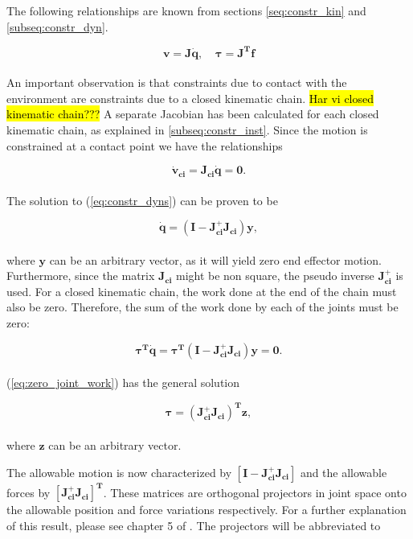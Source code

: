 The following relationships are known from sections \ref{seq:constr_kin} and \ref{subseq:constr_dyn}. 

\begin{equation}
	\mathbf{v = J \dot{q}} \textrm{,} \quad  \  \boldsymbol{\tau} \mathbf{= J^T f}
\end{equation}
\\
An important observation is that constraints due to contact with the environment are constraints due to a closed kinematic chain. \hl{Har vi closed kinematic chain???}
A separate Jacobian has been calculated for each closed kinematic chain, as explained in \ref{subseq:constr_inst}.
Since the motion is constrained at a contact point we have the relationships

\begin{equation} \label{eq:constr_dyns}
    \mathbf{\dot{v}_{ci} = J_{ci} \dot{q} = 0}.
\end{equation}
\\
The solution to (\ref{eq:constr_dyns}) can be proven to be

\begin{equation}
    \mathbf{\dot{q} = (I - J_{ci}^+ J_{ci}) y},
\end{equation}
\\
where $\mathbf{y}$ can be an arbitrary vector, as it will yield zero end effector motion. Furthermore, since the matrix $\mathbf{J_{ci}}$ might be non square, the pseudo inverse $\mathbf{J_{ci}^+}$ is used.
For a closed kinematic chain, the work done at the end of the chain must also be zero. Therefore, the sum of the work done by each of the joints must be zero:

\begin{equation} \label{eq:zero_joint_work}
    \boldsymbol{\tau^T} \mathbf{\dot{q}} = \boldsymbol{\tau^T} \mathbf{(I - J_{ci}^+ J_{ci}) y = 0}.
\end{equation}
\\
(\ref{eq:zero_joint_work}) has the general solution

\begin{equation}
   \boldsymbol{\tau}  \mathbf{= (J_{ci}^+ J_{ci})^T z},
\end{equation}
\\
where $\mathbf{z}$ can be an arbitrary vector.

The allowable motion is now characterized by $\mathbf{[I - J_{ci}^+ J_{ci}]}$ and the allowable forces by $\mathbf{[J_{ci}^+ J_{ci}]^T}$. These matrices are orthogonal projectors in joint space onto the allowable position and force variations respectively. For a further explanation of this result, please see chapter 5 of \cite{west1985method}. The projectors will be abbreviated to

